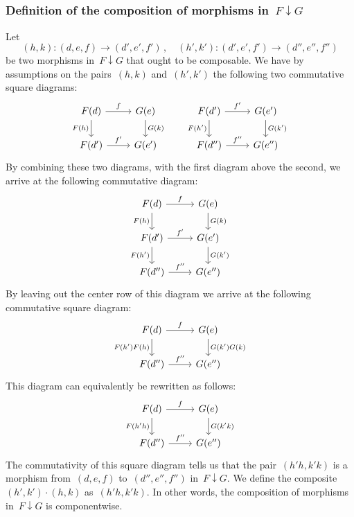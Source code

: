\subsection{}



\subsubsection*{Definition of the composition of morphisms in~$F ↓ G$}

Let
\[
	(h, k) \colon (d, e, f) \to (d', e', f') \,,
	\quad
	(h', k') \colon (d', e', f') \to (d'', e'', f'')
\]
be two morphisms in~$F ↓ G$ that ought to be composable.
We have by assumptions on the pairs~$(h, k)$ and~$(h', k')$ the following two commutative square diagrams:
\[
	\begin{tikzcd}
		F(d)
		\arrow{r}[above]{f}
		\arrow{d}[left]{F(h)}
		&
		G(e)
		\arrow{d}[right]{G(k)}
		\\
		F(d')
		\arrow{r}[above]{f'}
		&
		G(e')
	\end{tikzcd}
	\qquad
	\begin{tikzcd}
		F(d')
		\arrow{r}[above]{f'}
		\arrow{d}[left]{F(h')}
		&
		G(e')
		\arrow{d}[right]{G(k')}
		\\
		F(d'')
		\arrow{r}[above]{f''}
		&
		G(e'')
	\end{tikzcd}
\]
By combining these two diagrams, with the first diagram above the second, we arrive at the following commutative diagram:
\[
	\begin{tikzcd}
		F(d)
		\arrow{r}[above]{f}
		\arrow{d}[left]{F(h)}
		&
		G(e)
		\arrow{d}[right]{G(k)}
		\\
		F(d')
		\arrow{r}[above]{f'}
		\arrow{d}[left]{F(h')}
		&
		G(e')
		\arrow{d}[right]{G(k')}
		\\
		F(d'')
		\arrow{r}[above]{f''}
		&
		G(e'')
	\end{tikzcd}
\]
By leaving out the center row of this diagram we arrive at the following commutative square diagram:
\[
	\begin{tikzcd}
		F(d)
		\arrow{r}[above]{f}
		\arrow{d}[left]{F(h') F(h)}
		&
		G(e)
		\arrow{d}[right]{G(k') G(k)}
		\\
		F(d'')
		\arrow{r}[above]{f''}
		&
		G(e'')
	\end{tikzcd}
\]
This diagram can equivalently be rewritten as follows:
\[
	\begin{tikzcd}
		F(d)
		\arrow{r}[above]{f}
		\arrow{d}[left]{F(h' h)}
		&
		G(e)
		\arrow{d}[right]{G(k' k)}
		\\
		F(d'')
		\arrow{r}[above]{f''}
		&
		G(e'')
	\end{tikzcd}
\]
The commutativity of this square diagram tells us that the pair~$(h' h, k' k)$ is a morphism from~$(d, e, f)$ to~$(d'', e'', f'')$ in~$F ↓ G$.
We define the composite~$(h', k') ⋅ (h, k)$ as~$(h' h, k' k)$.
In other words, the composition of morphisms in~$F ↓ G$ is componentwise.

